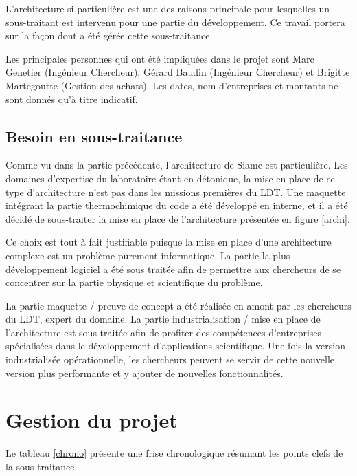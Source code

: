 L'architecture si particulière est une des raisons principale pour lesquelles un sous-traitant est intervenu pour une partie du développement. Ce travail portera sur la façon dont a été gérée cette sous-traitance.

Les principales personnes qui ont été impliquées dans le projet sont Marc Genetier (Ingénieur Chercheur), Gérard Baudin (Ingénieur Chercheur) et Brigitte Martegoutte (Gestion des achats). Les dates, nom d'entreprises et montants ne sont donnés qu'à titre indicatif. 

\section{Besoin en sous-traitance}

Comme vu dans la partie précédente, l'architecture de Siame est particulière. Les domaines d'expertise du laboratoire étant en détonique, la mise en place de ce type d’architecture n’est pas dans les missions premières du LDT. Une maquette intégrant la partie thermochimique du code a été développé en interne, et il a été décidé de sous-traiter la mise en place de l'architecture présentée en figure \ref{archi}.

Ce choix est tout à fait justifiable puisque la mise en place d'une architecture complexe est un problème purement informatique. La partie la plus \og développement logiciel \fg{} a été sous traitée afin de permettre aux chercheurs de se concentrer sur la partie physique et scientifique du problème. 

La partie maquette / preuve de concept a été réalisée en amont par les chercheurs du LDT, expert du domaine. La partie industrialisation / mise en place de l’architecture est sous traitée afin de profiter des compétences d’entreprises spécialisées dans le développement d’applications scientifique. Une fois la version industrialisée opérationnelle, les chercheurs peuvent se servir de cette nouvelle version plus performante et y ajouter de nouvelles fonctionnalités. 

\chapter{Gestion du projet}

Le tableau \ref{chrono} présente une frise chronologique résumant les points clefs de la sous-traitance. 

